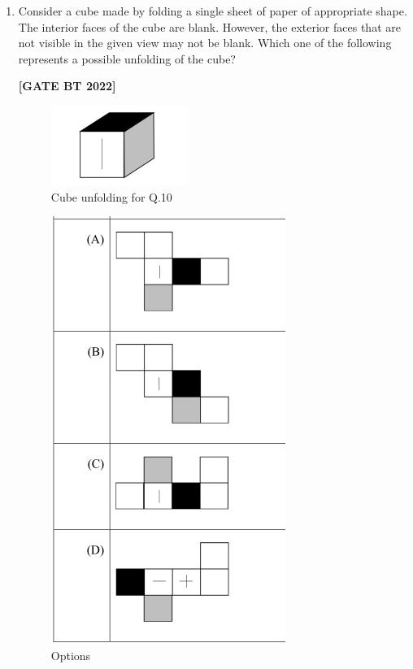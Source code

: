 \documentclass[12pt]{article}
\begin{document}
\begin{enumerate}[leftmargin=2.5em, label=\textbf{Q.\arabic*}., itemsep=2em, resume]
\item Consider a cube made by folding a single sheet of paper of appropriate shape. The interior faces of the cube are blank. However, the exterior faces that are not visible in the given view may not be blank. Which one of the following represents a possible unfolding of the cube?

\noindent \textbf{[GATE BT 2022]}
\begin{figure}[H]\centering
\includegraphics[width=0.6\columnwidth]{figs/q10.png}
\caption{Cube unfolding for Q.10}
\label{fig:q10}
\end{figure}

\begin{figure}[H]\centering
\includegraphics[width=0.6\columnwidth]{figs/q10o.png}
\caption{Options}
\label{fig:q10o}
\end{figure}

\end{enumerate}
\end{document}
